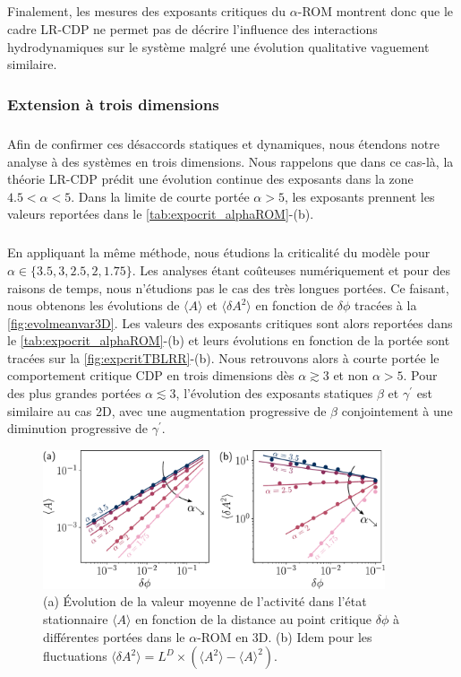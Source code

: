 \subparagraph{}Finalement, les mesures des exposants critiques du $\alpha$-ROM montrent donc que le cadre LR-CDP ne permet pas de décrire l'influence des interactions hydrodynamiques sur le système malgré une évolution qualitative vaguement similaire.

\subsubsection{Extension à trois dimensions}

\subparagraph{}Afin de confirmer ces désaccords statiques et dynamiques, nous étendons notre analyse à des systèmes en trois dimensions. Nous rappelons que dans ce cas-là, la théorie LR-CDP prédit une évolution continue des exposants dans la zone $4.5<\alpha<5$. Dans la limite de courte portée $\alpha>5$, les exposants prennent les valeurs reportées dans le \autoref{tab:expocrit_alphaROM}-(b).

\subparagraph{}En appliquant la même méthode, nous étudions la criticalité du modèle pour $\alpha \in \{3.5, 3, 2.5, 2, 1.75\}$. Les analyses étant coûteuses numériquement et pour des raisons de temps, nous n'étudions pas le cas des très longues portées. Ce faisant, nous obtenons les évolutions de $\langle A \rangle$ et $\langle\delta A^2\rangle$ en fonction de $\delta\phi$ tracées à la \autoref{fig:evolmeanvar3D}. Les valeurs des exposants critiques sont alors reportées dans le \autoref{tab:expocrit_alphaROM}-(b) et leurs évolutions en fonction de la portée sont tracées sur la \autoref{fig:expcritTBLRR}-(b). Nous retrouvons alors à courte portée le comportement critique CDP en trois dimensions dès $\alpha \gtrsim 3$ et non $\alpha>5$. Pour des plus grandes portées $\alpha\lesssim 3$, l'évolution des exposants statiques $\beta$ et $\gamma^\prime$ est similaire au cas 2D, avec une augmentation progressive de $\beta$ conjointement à une diminution progressive de $\gamma^\prime$.

\begin{figure}[h]
	\centering
	\includegraphics[width=0.9\textwidth]{Chapitre3/Figures/BetaGamma/EvolMeanVar3D_edited.pdf}
	\caption{(a) Évolution de la valeur moyenne de l'activité dans l'état stationnaire $\langle A \rangle$ en fonction de la distance au point critique $\delta\phi$ à différentes portées dans le $\alpha$-ROM en 3D. (b) Idem pour les fluctuations $\langle \delta A^2\rangle = L^D\times(\langle A ^2 \rangle - \langle A \rangle^2)$.}
	\label{fig:evolmeanvar3D}
\end{figure}

